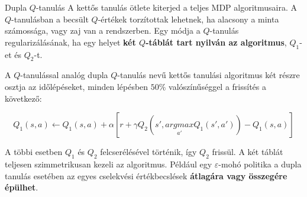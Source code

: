 \documentclass[english, aspectratio=169]{beamer}
\begin{document}
\begin{frame}{Dupla $Q$-tanulás}
A kettős tanulás ötlete kiterjed a teljes MDP algoritmusaira. A $Q$-tanulásban a becsült $Q$-értékek torzítottak lehetnek, ha alacsony a minta számossága, vagy zaj van a rendszerben. Egy módja a $Q$-tanulás regularizálásának, ha egy helyet\textbf{ két $Q$-táblát tart nyilván az algoritmus}, $Q_1$-et és $Q_2$-t.\par\smallskip
A $Q$-tanulással analóg dupla $Q$-tanulás nevű kettős tanulási algoritmus két részre osztja az időlépéseket, minden lépésben $50\%$ valószínűséggel a frissítés a következő:
\begin{block}{}
\[
Q_1(s,a) \leftarrow Q_1(s,a) + \alpha \left[ r + \gamma Q_2\left(s', \underset{a'}{argmax} Q_1(s',a')\right) - Q_1(s, a) \right]
\]
\end{block}
A többi esetben $Q_1$ és $Q_2$ felcserélésével történik, így $Q_2$ frissül. A két táblát teljesen szimmetrikusan kezeli az algoritmus. Például egy $\varepsilon$-mohó politika a dupla tanulás esetében az egyes cselekvési értékbecslések \textbf{átlagára vagy összegére épülhet}.
\end{frame}
\end{document}
